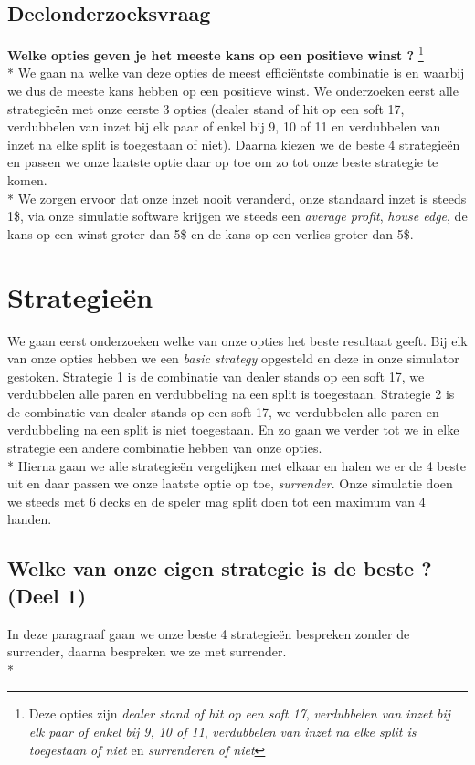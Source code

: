 \documentclass[conference]{IEEEtran}
\begin{document}
\subsection{Deelonderzoeksvraag} 
\textbf{Welke opties geven je het meeste kans op een positieve winst ?} 
\footnote{ Deze opties zijn {\it dealer stand of hit op een soft 17}, {\it verdubbelen van inzet bij elk paar of enkel bij 9, 10 of 11},
    {\it verdubbelen van inzet na elke split is toegestaan of niet} en {\it surrenderen of niet}}\\*
We gaan na welke van deze opties de meest effici\"entste combinatie is en waarbij we dus de meeste kans hebben op een positieve winst.
We onderzoeken eerst alle strategie\"en met onze eerste 3 opties (dealer stand of hit op een soft 17, verdubbelen van inzet bij elk paar of enkel bij 9, 10 of 11 en verdubbelen van inzet na elke split is toegestaan of niet). Daarna kiezen we de beste 4 strategie\"en en passen we onze laatste optie daar op toe om zo tot onze beste strategie te komen. \\*
We zorgen ervoor dat onze inzet nooit veranderd, onze standaard inzet is steeds 1\$, via onze simulatie software krijgen we steeds een \textit{average profit}, \textit{house edge}, de kans op een winst groter dan 5\$ en de kans op een verlies groter dan 5\$. 

\newpage

\section{Strategie\"en}
We gaan eerst onderzoeken welke van onze opties het beste resultaat geeft. Bij elk van onze opties hebben we een \textit{basic strategy}
opgesteld en deze in onze simulator gestoken. Strategie 1 is de combinatie van dealer stands op een soft 17, we verdubbelen alle paren en
verdubbeling na een split is toegestaan. Strategie 2 is de combinatie van dealer stands op een soft 17, we verdubbelen alle paren en
verdubbeling na een split is niet toegestaan. En zo gaan we verder tot we in elke strategie een andere combinatie hebben van onze opties.\\*
Hierna gaan we alle strategie\"en vergelijken met elkaar en halen we er de 4 beste uit en daar passen we onze laatste optie op toe, \textit{surrender}. Onze simulatie doen we steeds met 6 decks en de speler mag split doen tot een maximum van 4 handen.

\subsection{Welke van onze eigen strategie is de beste ? (Deel 1)}
In deze paragraaf gaan we onze beste 4 strategie\"en bespreken zonder de surrender, daarna bespreken we ze met surrender.\\*
\end{document}
